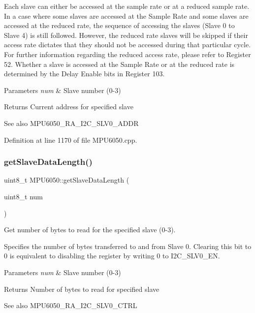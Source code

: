 Each slave can either be accessed at the sample rate or at a reduced sample rate. In a case where some slaves are accessed at the Sample Rate and some slaves are accessed at the reduced rate, the sequence of accessing the slaves (Slave 0 to Slave 4) is still followed. However, the reduced rate slaves will be skipped if their access rate dictates that they should not be accessed during that particular cycle. For further information regarding the reduced access rate, please refer to Register 52. Whether a slave is accessed at the Sample Rate or at the reduced rate is determined by the Delay Enable bits in Register 103.


\begin{DoxyParams}{Parameters}
{\em num} & Slave number (0-\/3) \\
\hline
\end{DoxyParams}
\begin{DoxyReturn}{Returns}
Current address for specified slave 
\end{DoxyReturn}
\begin{DoxySeeAlso}{See also}
M\+P\+U6050\+\_\+\+R\+A\+\_\+\+I2\+C\+\_\+\+S\+L\+V0\+\_\+\+A\+D\+DR 
\end{DoxySeeAlso}


Definition at line 1170 of file M\+P\+U6050.\+cpp.

\mbox{\label{classMPU6050_a54c2a48b3cb79106bcaf75accf6cd311}} 
\subsubsection{\texorpdfstring{getSlaveDataLength()}{getSlaveDataLength()}}
{\footnotesize\ttfamily uint8\+\_\+t M\+P\+U6050\+::get\+Slave\+Data\+Length (\begin{DoxyParamCaption}\item[{uint8\+\_\+t}]{num }\end{DoxyParamCaption})}



Get number of bytes to read for the specified slave (0-\/3). 

Specifies the number of bytes transferred to and from Slave 0. Clearing this bit to 0 is equivalent to disabling the register by writing 0 to I2\+C\+\_\+\+S\+L\+V0\+\_\+\+EN. 
\begin{DoxyParams}{Parameters}
{\em num} & Slave number (0-\/3) \\
\hline
\end{DoxyParams}
\begin{DoxyReturn}{Returns}
Number of bytes to read for specified slave 
\end{DoxyReturn}
\begin{DoxySeeAlso}{See also}
M\+P\+U6050\+\_\+\+R\+A\+\_\+\+I2\+C\+\_\+\+S\+L\+V0\+\_\+\+C\+T\+RL 
\end{DoxySeeAlso}


